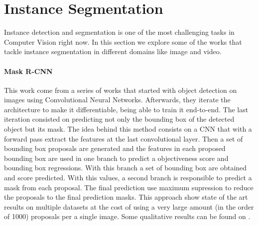 

\section{Instance Segmentation}
\label{sec:soa_instancesegmentation}

Instance detection and segmentation is one of the most challenging tasks in Computer Vision right now.
In this section we explore some of the works that tackle instance segmentation in different domains like image and video.

\paragraph{Mask R-CNN~\maskrcnn}
This work come from a series of works that started with object detection on images using Convolutional Neural Networks.
Afterwards, they iterate the architecture to make it differentiable, being able to train it end-to-end.
The last iteration consisted on predicting not only the bounding box of the detected object but its mask.
The idea behind this method consists on a CNN that with a forward pass extract the features at the last convolutional layer.
Then a set of bounding box proposals are generated and the features in each proposed bounding box are used in one branch to predict a objectiveness score and bounding box regressions.
With this branch a set of bounding box are obtained and score predicted. With this values, a second branch is responsible to predict a mask from each proposal.
The final prediction use maximum supression to reduce the proposals to the final prediction masks.
This approach show state of the art results on multiple datasets at the cost of using a very large amount (in the order of 1000) proposals per a single image.
Some qualitative results can be found on .

